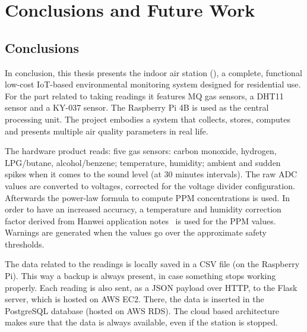 

\chapter{Conclusions and Future Work}
\label{ch:conclusions}

\section{Conclusions}
\label{sec:conclusions}

In conclusion, this thesis presents the indoor air station (\airnest{}), a complete, functional
low-cost IoT-based environmental monitoring system designed for residential use. For the part
related to taking readings it features MQ gas sensors, a DHT11 sensor and a KY-037 sensor. The
Raspberry Pi 4B is used as the central processing unit. The project embodies a system that
collects, stores, computes and presents multiple air quality parameters in real life.

The hardware product reads: five gas sensors: carbon monoxide, hydrogen, LPG/butane,
alcohol/benzene; temperature, humidity; ambient and sudden spikes when it comes to the sound
level (at 30 minutes intervals). The raw ADC values are converted to voltages, corrected for
the voltage divider configuration. Afterwards the power-law formula to compute PPM
concentrations is used. In order to have an increased accuracy, a temperature and humidity
correction factor derived from Hanwei application notes~\cite{hanwei} is used for the PPM
values. Warnings are generated when the values go over the approximate safety thresholds.

The data related to the readings is locally saved in a CSV file (on the Raspberry Pi). This
way a backup is always present, in case something stops working properly. Each reading is also
sent, as a JSON payload over HTTP, to the Flask server, which is hosted on AWS EC2. There, the
data is inserted in the PostgreSQL database (hosted on AWS RDS). The cloud based architecture
makes sure that the data is always available, even if the station is stopped.

